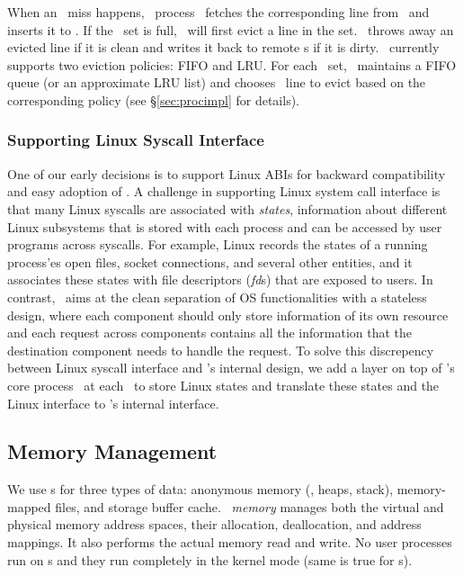 \documentclass[10pt,times,twocolumn]{z2-article}
\begin{document}
{{{{{{{When an \excache\ miss happens, 
\lego\ process \microos\ fetches the corresponding line from \mcomponent\ and inserts it to \excache.
If the \excache\ set is full, \lego\ will first evict a line in the set.
\lego\ throws away an evicted line if it is clean
and writes it back to remote \mcomponent{}s if it is dirty.
\lego\ currently supports two eviction policies: FIFO and LRU.
For each \excache\ set, \lego\ maintains a FIFO queue (or an approximate LRU list)
and chooses \excache\ line to evict based on the corresponding policy (see \S\ref{sec:procimpl} for details).

\subsubsection{Supporting Linux Syscall Interface}
One of our early decisions is to support Linux ABIs for backward compatibility
and easy adoption of \lego.
A challenge in supporting Linux system call interface is that 
many Linux syscalls are associated with {\em states},
information about different Linux subsystems that is stored with each process 
and can be accessed by user programs across syscalls.
For example, Linux records the states of a running process'es open files, socket connections, and several other entities,
and it associates these states with file descriptors ({\em fd}s) that are exposed to users.
In contrast, \lego\ aims at the clean separation of OS functionalities with a stateless design,
where each component should only store information of its own resource
and each request across components contains all the information that the destination component needs to handle the request.
To solve this discrepency between Linux syscall interface and \lego's internal design, 
we add a layer on top of \lego's core process \microos\ at each \pcomponent\ to store Linux states
and translate these states and the Linux interface to \lego's internal interface.

\subsection{Memory Management}
We use \mcomponent{}s for three types of data:
anonymous memory (\ie, heaps, stack), 
memory-mapped files, and storage buffer cache.
\lego\ {\em memory \microos{}}
manages both the virtual and physical memory address spaces,
their allocation, deallocation, and address mappings.
It also performs the actual memory read and write.
No user processes run on \mcomponent{}s 
and they run completely in the kernel mode
(same is true for \scomponent{}s). 

}}}}}}}
\end{document}
